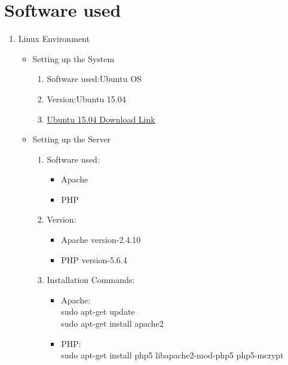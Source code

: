 \documentclass[a4paper,12pt,oneside]{book}
\begin{document}
\section{Software used}
\begin{enumerate}
    \item Linux Environment
        \begin{itemize}
            \item Setting up the System 
                \begin{enumerate}
                    \item Software used:Ubuntu OS
                    \item Version:Ubuntu 15.04
                    \item \href{http://old-releases.ubuntu.com/releases/15.04/}{Ubuntu 15.04 Download Link}
                \end{enumerate}
            \item Setting up the Server
                \begin{enumerate}
                    \item Software used:
                        \begin{itemize}
                            \item Apache
                            \item PHP
                        \end{itemize}
                    \item Version:
                        \begin{itemize}
                            \item{Apache version-2.4.10}
                            \item{PHP version-5.6.4}
                        \end{itemize}
                    \item Installation Commands:
                        \begin{itemize}
                            \item{Apache: \\
                            sudo apt-get update\\
                            sudo apt-get install apache2}
                            \item {PHP:\\
                            sudo apt-get install php5 libapache2-mod-php5 php5-mcrypt}
                        \end{itemize}

\end{enumerate}
\end{itemize}
\end{enumerate}
\end{document}
